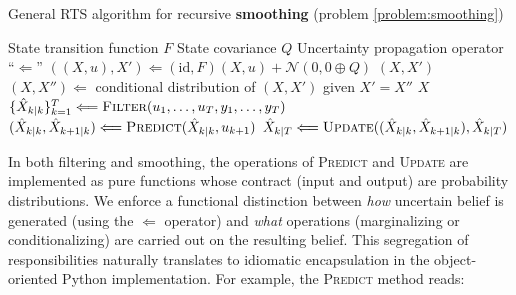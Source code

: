 \documentclass[oneside, article]{memoir}
\begin{document}
\begin{algorithm}
  \caption{
    \label{alg:rts-smoother}
    General RTS algorithm for recursive \textbf{smoothing} (problem
  \ref{problem:smoothing})}
  \begin{algorithmic}[1]
    \Require State transition function \(F\)
    \Require State covariance \(Q\)
    \Require Uncertainty propagation operator ``\(\Longleftarrow\)''
    \State
    \(((X, u), X') \Longleftarrow (\text{id} , F)(X, u) +
    \mathcal{N}(0, 0 \oplus Q)\)
    \State\Return \((X, X')\)
    \EndFunction
    \State
    \((X, X'') \Longleftarrow\) conditional distribution of
    \((X,X')\) given \(X' = X''\)
    \State\Return \(X\)
    \EndFunction
    \State \(\{\hat X_{k|k}\}_{k=1}^T \Longleftarrow
    \textsc{Filter}(u_1, \ldots, u_T, y_1, \ldots, y_T)\)
    \State \( (\hat X_{k|k}, \hat X_{k+1|k}) \Longleftarrow
    \textsc{Predict}(\hat X_{k \mid k}, u_{k+1}) \)
    \State \( \hat X_{k|T} \Longleftarrow \textsc{Update}((\hat
    X_{k|k}, \hat X_{k+1|k}), \hat X_{k|T}) \)
    \EndFor
    \EndProcedure
  \end{algorithmic}
\end{algorithm}

In both filtering and smoothing, the operations of \textsc{Predict}
and \textsc{Update} are implemented as pure functions whose contract
(input and output) are probability distributions.
We enforce a functional distinction between \emph{how} uncertain
belief is generated (using the \(\Longleftarrow\) operator) and
\emph{what} operations (marginalizing or conditionalizing) are
carried out on the resulting belief.
This segregation of responsibilities naturally translates to
idiomatic encapsulation in the object-oriented Python implementation.
For example, the \textsc{Predict} method reads:
\end{document}
